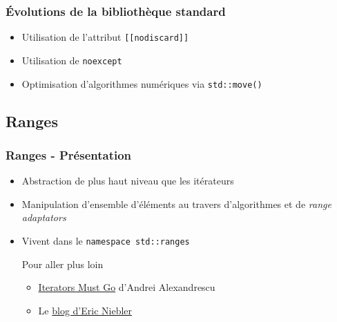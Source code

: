 \documentclass[C++.tex]{subfiles}
\begin{document}
\begin{frame}[fragile]
	\frametitle{Évolutions de la bibliothèque standard}
	\begin{itemize}
		\item Utilisation de l'attribut \lstinline|[[nodiscard]]|
		\item Utilisation de \lstinline|noexcept|
		\item Optimisation d'algorithmes numériques via \lstinline|std::move()|

	\end{itemize}
\end{frame}

\subsection*{Ranges}
\begin{frame}
	\frametitle{Ranges - Présentation}
	\begin{itemize}
		\item Abstraction de plus haut niveau que les itérateurs
		\item Manipulation d'ensemble d'éléments au travers d'algorithmes et de \textit{range adaptators}
		\item Vivent dans le \lstinline|namespace std::ranges|



		\begin{block}{Pour aller plus loin}
			\begin{itemize}
				\item \href{https://accu.org/content/conf2009/AndreiAlexandrescu_iterators-must-go.pdf}{\og Iterators Must Go\fg{}} d'Andrei Alexandrescu


				\item Le \href{http://ericniebler.com/}{blog d'Eric Niebler}
			\end{itemize}
		\end{block}
	\end{itemize}
\end{frame}
\end{document}
